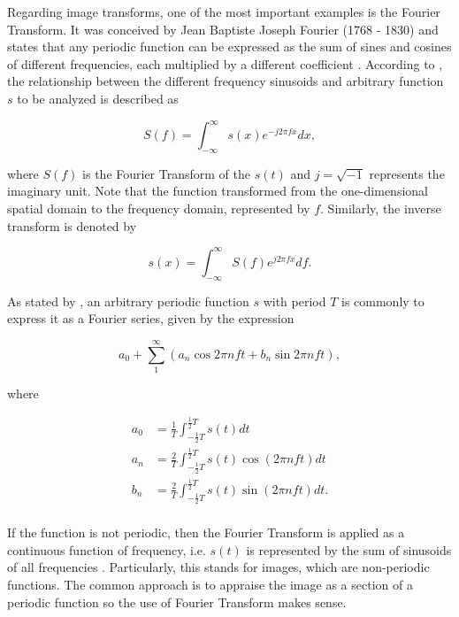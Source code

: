 Regarding image transforms, one of the most important examples is the Fourier Transform. It was conceived by Jean Baptiste Joseph Fourier (1768 - 1830) and states that any periodic function can be expressed as the sum of sines and cosines of different frequencies, each multiplied by a different coefficient \cite{gonzalez2018digital}. According to , the relationship between the different frequency sinusoids and arbitrary function $s$ to be analyzed is described as

\begin{equation}
\label{eqn:fourier_transform}
S(f) = \int_{-\infty}^{\infty}s(x)e^{-j 2 \pi f x} dx,
\end{equation}

\noindent where $S(f)$ is the Fourier Transform of the $s(t)$ and $j = \sqrt{-1}$ represents the imaginary unit. Note that the function transformed from the one-dimensional spatial domain to the frequency domain, represented by $f$. Similarly, the inverse transform is denoted by

\begin{equation}
\label{eqn:inverse_fourier_transform}
s(x) = \int_{-\infty}^{\infty}S(f)e^{j 2 \pi f x} df.
\end{equation}

As stated by , an arbitrary periodic function $s$ with period $T$ is commonly to express it as a Fourier series, given by the expression

\begin{equation}
\label{eqn:fourier_series}
a_{0} + \sum_{1}^{\infty} (a_{n} \cos{2 \pi n f t} + b_{n} \sin{2 \pi n f t}),
\end{equation}

\noindent where

\begin{align*}
a_{0} &= \frac{1}{T} \int_{-\frac{1}{2} T}^{\frac{1}{2} T} s(t) dt\\
a_{n} &= \frac{2}{T} \int_{-\frac{1}{2} T}^{\frac{1}{2} T} s(t) \cos{(2 \pi n f t)} dt\\
b_{n} &= \frac{2}{T} \int_{-\frac{1}{2} T}^{\frac{1}{2} T} s(t) \sin{(2 \pi n f t)} dt.\\
\end{align*}

If the function is not periodic, then the Fourier Transform is applied as a continuous function of frequency, i.e. $s(t)$ is represented by the sum of sinusoids of all frequencies \cite{brigham1988fast}. Particularly, this stands for images, which are non-periodic functions. The common approach is to appraise the image as a section of a periodic function so the use of Fourier Transform makes sense.

